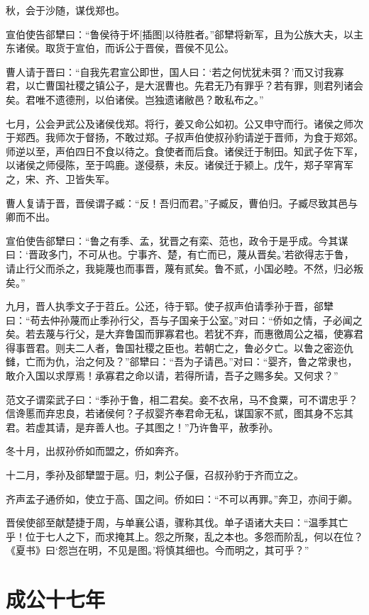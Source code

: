 \documentclass[a4paper,12pt,UTF8,twoside]{ctexbook}
\begin{document}
秋，会于沙随，谋伐郑也。

宣伯使告郤犫曰：“鲁侯待于坏[插图]以待胜者。”郤犫将新军，且为公族大夫，以主东诸侯。取货于宣伯，而诉公于晋侯，晋侯不见公。

曹人请于晋曰：“自我先君宣公即世，国人曰：‘若之何忧犹未弭？’而又讨我寡君，以亡曹国社稷之镇公子，是大泯曹也。先君无乃有罪乎？若有罪，则君列诸会矣。君唯不遗德刑，以伯诸侯。岂独遗诸敝邑？敢私布之。”

七月，公会尹武公及诸侯伐郑。将行，姜又命公如初。公又申守而行。诸侯之师次于郑西。我师次于督扬，不敢过郑。子叔声伯使叔孙豹请逆于晋师，为食于郑郊。师逆以至，声伯四日不食以待之。食使者而后食。诸侯迁于制田。知武子佐下军，以诸侯之师侵陈，至于鸣鹿。遂侵蔡，未反。诸侯迁于颍上。戊午，郑子罕宵军之，宋、齐、卫皆失军。

曹人复请于晋，晋侯谓子臧：“反！吾归而君。”子臧反，曹伯归。子臧尽致其邑与卿而不出。

宣伯使告郤犫曰：“鲁之有季、孟，犹晋之有栾、范也，政令于是乎成。今其谋曰：‘晋政多门，不可从也。宁事齐、楚，有亡而已，蔑从晋矣。’若欲得志于鲁，请止行父而杀之，我毙蔑也而事晋，蔑有贰矣。鲁不贰，小国必睦。不然，归必叛矣。”

九月，晋人执季文子于苕丘。公还，待于郓。使子叔声伯请季孙于晋，郤犫曰：“苟去仲孙蔑而止季孙行父，吾与子国亲于公室。”对曰：“侨如之情，子必闻之矣。若去蔑与行父，是大弃鲁国而罪寡君也。若犹不弃，而惠徼周公之福，使寡君得事晋君。则夫二人者，鲁国社稷之臣也。若朝亡之，鲁必夕亡。以鲁之密迩仇雠，亡而为仇，治之何及？”郤犫曰：“吾为子请邑。”对曰：“婴齐，鲁之常隶也，敢介入国以求厚焉！承寡君之命以请，若得所请，吾子之赐多矣。又何求？”

范文子谓栾武子曰：“季孙于鲁，相二君矣。妾不衣帛，马不食粟，可不谓忠乎？信谗慝而弃忠良，若诸侯何？子叔婴齐奉君命无私，谋国家不贰，图其身不忘其君。若虚其请，是弃善人也。子其图之！”乃许鲁平，赦季孙。



冬十月，出叔孙侨如而盟之，侨如奔齐。

十二月，季孙及郤犫盟于扈。归，刺公子偃，召叔孙豹于齐而立之。

齐声孟子通侨如，使立于高、国之间。侨如曰：“不可以再罪。”奔卫，亦间于卿。

晋侯使郤至献楚捷于周，与单襄公语，骤称其伐。单子语诸大夫曰：“温季其亡乎！位于七人之下，而求掩其上。怨之所聚，乱之本也。多怨而阶乱，何以在位？《夏书》曰‘怨岂在明，不见是图。’将慎其细也。今而明之，其可乎？”

\section{成公十七年}
\end{document}
